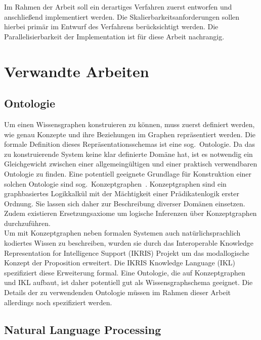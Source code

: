 \documentclass[11pt, a4paper]{scrreprt}
\begin{document}
Im Rahmen der Arbeit soll ein derartiges Verfahren zuerst entworfen und anschließend implementiert werden.
Die Skalierbarkeitsanforderungen sollen hierbei primär im Entwurf des Verfahrens berücksichtigt werden.
Die Parallelisierbarkeit der Implementation ist für diese Arbeit nachrangig.

\section{Verwandte Arbeiten}

\subsection{Ontologie}

Um einen Wissensgraphen konstruieren zu können, muss zuerst definiert werden, wie genau Konzepte und ihre Beziehungen im Graphen repräsentiert werden.
Die formale Definition dieses Repräsentationsschemas ist eine sog.\ Ontologie.
Da das zu konstruierende System keine klar definierte Domäne hat, ist es notwendig ein Gleichgewicht zwischen einer allgemeingültigen und einer praktisch verwendbaren Ontologie zu finden.
Eine potentiell geeignete Grundlage für Konstruktion einer solchen Ontologie sind sog.\ Konzeptgraphen~\cite[S. 213~ff.]{vanHarmelen:2007}.
Konzeptgraphen sind ein graphbasiertes Logikkalkül mit der Mächtigkeit einer Prädikatenlogik erster Ordnung.
Sie lassen sich daher zur Beschreibung diverser Domänen einsetzen.
Zudem existieren Ersetzungsaxiome um logische Inferenzen über Konzeptgraphen durchzuführen.\\

Um mit Konzeptgraphen neben formalen Systemen auch natürlichsprachlich kodiertes Wissen zu beschreiben, wurden sie durch das Interoperable Knowledge Representation for Intelligence Support (IKRIS) Projekt um das modallogische Konzept der Proposition erweitert.
Die IKRIS Knowledge Language (IKL)~\cite{ikl:online} spezifiziert diese Erweiterung formal.
Eine Ontologie, die auf Konzeptgraphen und IKL aufbaut, ist daher potentiell gut als Wissensgraphschema geeignet.
Die Details der zu verwendenden Ontologie müssen im Rahmen dieser Arbeit allerdings noch spezifiziert werden.

\subsection{Natural Language Processing}
\end{document}
